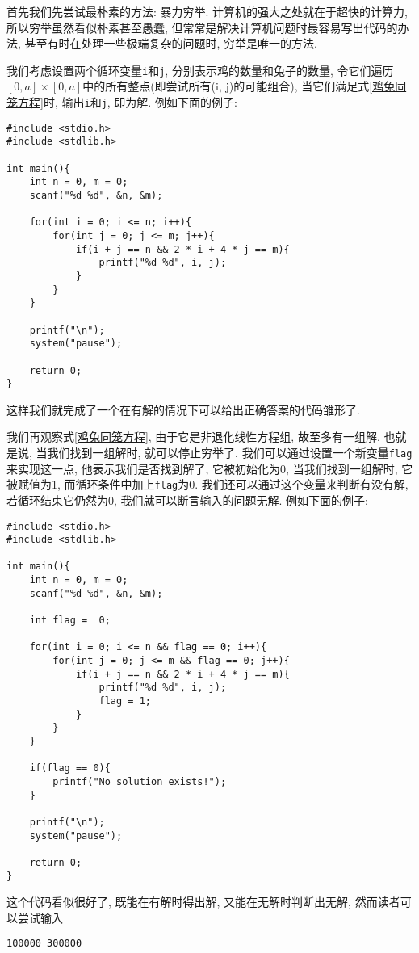         首先我们先尝试最朴素的方法: 暴力穷举. 计算机的强大之处就在于超快的计算力, 所以穷举虽然看似朴素甚至愚蠢, 但常常是解决计算机问题时最容易写出代码的办法, 甚至有时在处理一些极端复杂的问题时, 穷举是唯一的方法. 
        
        我们考虑设置两个循环变量\texttt{i}和\texttt{j}, 分别表示鸡的数量和兔子的数量, 令它们遍历 $ [0, a] \times [0, a]$中的所有整点(即尝试所有(i, j)的可能组合), 当它们满足式\ref{鸡兔同笼方程}时, 输出\texttt{i}和\texttt{j}, 即为解. 例如下面的例子:
\begin{lstlisting}
#include <stdio.h>
#include <stdlib.h>

int main(){
    int n = 0, m = 0;
    scanf("%d %d", &n, &m);

    for(int i = 0; i <= n; i++){
        for(int j = 0; j <= m; j++){
            if(i + j == n && 2 * i + 4 * j == m){
                printf("%d %d", i, j);
            }
        }
    }

    printf("\n");
    system("pause");

    return 0;
}
\end{lstlisting}

        这样我们就完成了一个在有解的情况下可以给出正确答案的代码雏形了.
        
        我们再观察式\ref{鸡兔同笼方程}, 由于它是非退化线性方程组, 故至多有一组解. 也就是说, 当我们找到一组解时, 就可以停止穷举了. 我们可以通过设置一个新变量\texttt{flag}来实现这一点, 他表示我们是否找到解了, 它被初始化为0, 当我们找到一组解时, 它被赋值为1, 而循环条件中加上\texttt{flag}为0. 我们还可以通过这个变量来判断有没有解, 若循环结束它仍然为0, 我们就可以断言输入的问题无解. 例如下面的例子:
\begin{lstlisting}
#include <stdio.h>
#include <stdlib.h>

int main(){
    int n = 0, m = 0;
    scanf("%d %d", &n, &m);

    int flag =  0;

    for(int i = 0; i <= n && flag == 0; i++){
        for(int j = 0; j <= m && flag == 0; j++){
            if(i + j == n && 2 * i + 4 * j == m){
                printf("%d %d", i, j);
                flag = 1;
            }
        }
    }

    if(flag == 0){
        printf("No solution exists!");
    }

    printf("\n");
    system("pause");

    return 0;
}
\end{lstlisting}

        这个代码看似很好了, 既能在有解时得出解, 又能在无解时判断出无解, 然而读者可以尝试输入
\begin{lstlisting}
100000 300000
\end{lstlisting}

